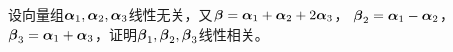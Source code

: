 \begin{frame}
\end{frame}

\begin{frame}
  \begin{li}
    设向量组$\alphabd_1,\alphabd_2,\alphabd_3$线性无关，又$\betabd=\alphabd_1+\alphabd_2+2\alphabd_3$，
    $\betabd_2=\alphabd_1-\alphabd_2$，$\betabd_3=\alphabd_1+\alphabd_3$，证明$\betabd_1,\betabd_2,\betabd_3$线性相关。       
  \end{li}
\end{frame}

